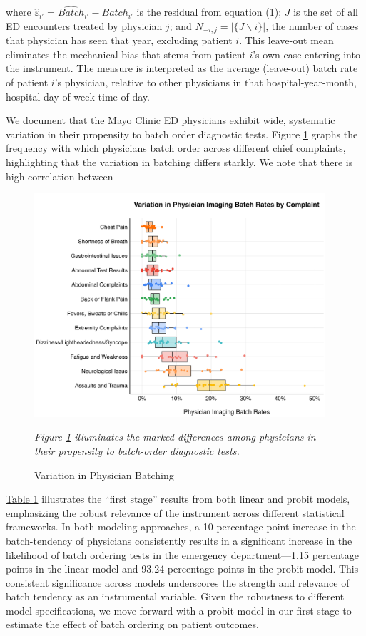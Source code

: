 \documentclass[,,nonblindrev]{informs}
\begin{document}
where \(\hat{\varepsilon}_{i'} = \hat{Batch}_{i'} - Batch_{i'}\) is the
residual from equation (1); \(J\) is the set of all ED encounters
treated by physician \(j\); and \(N_{-i,j} = |\{J \backslash i\}|\), the
number of cases that physician has seen that year, excluding patient
\(i\). This leave-out mean eliminates the mechanical bias that stems
from patient \(i\)'s own case entering into the instrument. The measure
is interpreted as the average (leave-out) batch rate of patient \(i\)'s
physician, relative to other physicians in that hospital-year-month,
hospital-day of week-time of day.

We document that the Mayo Clinic ED physicians exhibit wide, systematic
variation in their propensity to batch order diagnostic tests. Figure
\ref{fig:physician_batching} graphs the frequency with which physicians
batch order across different chief complaints, highlighting that the
variation in batching differs starkly. We note that there is high
correlation between

\begin{figure}[h]
  \centering
  \caption{Variation in Physician Batching}
  \label{fig:physician_batching}
  \includegraphics[width=4.25in]{../outputs/figures/Figure 1.png}
\begin{tablenotes}
\small
\item \textit{Figure \ref{fig:physician_batching} illuminates the marked differences among physicians in their propensity to batch-order diagnostic tests.}
\end{tablenotes}  
\end{figure}

\hyperref[table:first_stage]{Table 1} illustrates the ``first stage''
results from both linear and probit models, emphasizing the robust
relevance of the instrument across different statistical frameworks. In
both modeling approaches, a 10 percentage point increase in the
batch-tendency of physicians consistently results in a significant
increase in the likelihood of batch ordering tests in the emergency
department---1.15 percentage points in the linear model and 93.24
percentage points in the probit model. This consistent significance
across models underscores the strength and relevance of batch tendency
as an instrumental variable. Given the robustness to different model
specifications, we move forward with a probit model in our first stage
to estimate the effect of batch ordering on patient outcomes.
\end{document}
